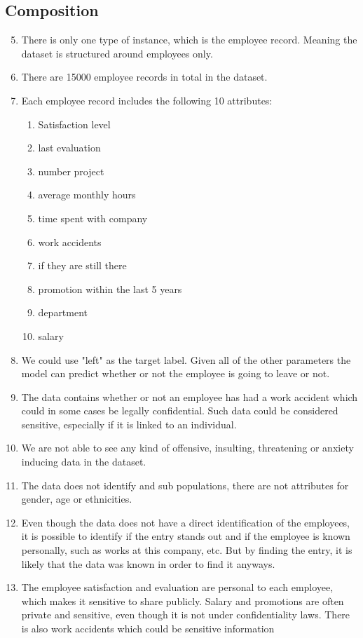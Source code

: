 \documentclass[a4paper]{article}
\newcommand{\enum}[1]{\begin{enumerate}[labelsep=0.3cm,labelwidth=\widthof{\ref{last-item}}, itemindent=0em,leftmargin=!, label=\arabic*).]#1 \end{enumerate}}
\newcommand{\enuma}[1]{\begin{enumerate}[labelsep=0.3cm,labelindent=0pt,itemindent=0em,labelwidth=\widthof{\ref{last-item}}, label=(\alph*)]#1 \end{enumerate}}
\begin{document}
\subsection*{Composition}
\enum{
\setcounter{enumi}{4}
\item There is only one type of instance, which is the employee record. Meaning the dataset is structured around employees only. 
\item There are 15000 employee records in total in the dataset.
\setcounter{enumi}{7}
\item Each employee record includes the following 10 attributes:
\enuma{
\item Satisfaction level
\item last evaluation
\item number project
\item average monthly hours
\item time spent with company
\item work accidents
\item if they are still there
\item promotion within the last 5 years
\item department
\item salary
}
\item We could use "left" as the target label. Given all of the other parameters the model can predict whether or not the employee is going to leave or not.
\setcounter{enumi}{14}
\item  The data contains whether or not an employee has had a work accident which could in some cases be legally confidential. Such data could be considered sensitive, especially if it is linked to an individual. 
\item We are not able to see any kind of offensive, insulting, threatening or anxiety inducing data in the dataset.
\item The data does not identify and sub populations, there are not attributes for gender, age or ethnicities.
\item Even though the data does not have a direct identification of the employees, it is possible to identify if the entry stands out and if the employee is known personally, such as works at this company, etc. But by finding the entry, it is likely that the data was known in order to find it anyways.
\item The employee satisfaction and evaluation are personal to each employee, which makes it sensitive to share publicly. Salary and promotions are often private and sensitive, even though it is not under confidentiality laws. There is also work accidents which could be sensitive information
}
\end{document}
